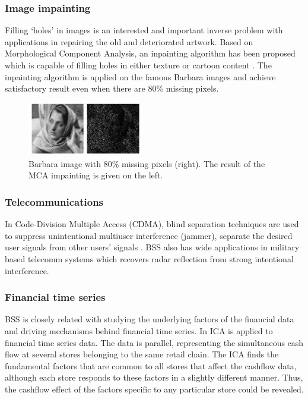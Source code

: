 \subsubsection{Image impainting}
Filling `holes' in images is an interested and important inverse problem with applications in repairing the old and deteriorated artwork. Based on Morphological Component Analysis, an inpainting algorithm has been proposed  which is capable of filling holes in either texture or cartoon content \cite{ELAD2005340}. The inpainting algorithm is applied on the famous Barbara images and achieve satisfactory result even when there are 80\% missing pixels. 
\begin{figure}[H]
\centering
\includegraphics[width=0.45\textwidth]{images/impainting1.png}
\caption{Barbara image with $80\%$ missing pixels (right). The result of the MCA impainting is
given on the left.}
\label{imapint1}
\end{figure}


\subsubsection{Telecommunications} 
In Code-Division Multiple Access (CDMA), blind separation techniques are used to suppress unintentional multiuser interference (jammer), separate the desired user signals from other users' signals \cite{Raju2006}. BSS also has wide applications in military based telecomm systems which recovers radar reflection from strong intentional interference.

\subsubsection{Financial time series}
BSS is closely related with studying the underlying factors of the financial data and driving mechanisms behind financial time series. In \cite{OjaE2000Icaf} ICA is applied to financial time series data. The data is parallel, representing the simultaneous cash flow at several stores belonging to the same retail chain. The ICA finds the fundamental factors that are common to all stores that affect the cashflow data, although each store responds to these factors in a slightly different manner. Thus, the cashflow effect of the factors specific to any particular store could be revealed.
\newpage

